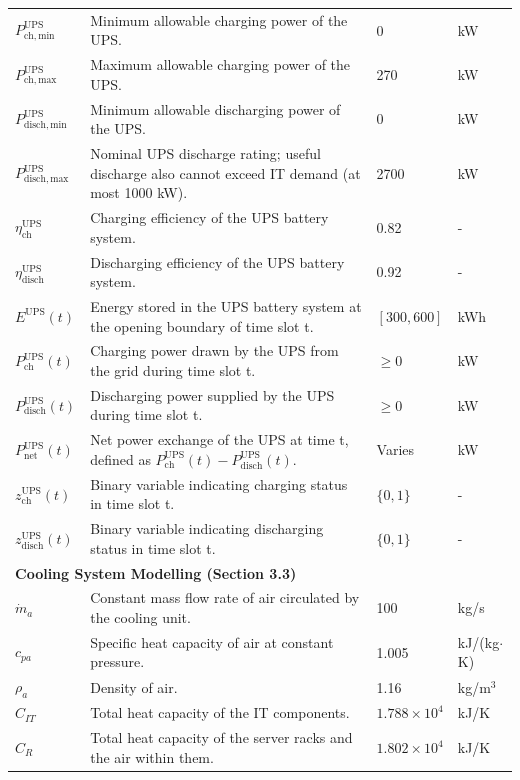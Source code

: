 \documentclass[lettersize,journal]{IEEEtran}
\begin{document}
{{\begin{longtable}{p{} p{} p{} p{}}
$P^{\mathrm{UPS}}_{\mathrm{ch,min}}$ & Minimum allowable charging power of the UPS. & 0 &kW \\
$P^{\mathrm{UPS}}_{\mathrm{ch,max}}$ & Maximum allowable charging power of the UPS. & 270 &kW \\
$P^{\mathrm{UPS}}_{\mathrm{disch,min}}$ & Minimum allowable discharging power of the UPS. & 0 &kW \\
$P^{\mathrm{UPS}}_{\mathrm{disch,max}}$ & Nominal UPS discharge rating; useful discharge also cannot exceed IT demand (at most 1000 kW). & 2700 &kW \\
$\eta^{\mathrm{UPS}}_{\mathrm{ch}}$ & Charging efficiency of the UPS battery system. & 0.82 & - \\
$\eta^{\mathrm{UPS}}_{\mathrm{disch}}$ & Discharging efficiency of the UPS battery system. & 0.92 & - \\
$E^{\mathrm{UPS}}(t)$ & Energy stored in the UPS battery system at the opening boundary of time slot t. & $[300, 600]$ &kWh \\
$P^{\mathrm{UPS}}_{\mathrm{ch}}(t)$ & Charging power drawn by the UPS from the grid during time slot t. & $\geq 0$ &kW \\
$P^{\mathrm{UPS}}_{\mathrm{disch}}(t)$ & Discharging power supplied by the UPS during time slot t. & $\geq 0$ &kW \\
$P^{\mathrm{UPS}}_{\mathrm{net}}(t)$ & Net power exchange of the UPS at time t, defined as $P^{\mathrm{UPS}}_{\mathrm{ch}}(t) - P^{\mathrm{UPS}}_{\mathrm{disch}}(t)$. & Varies &kW \\
$z^{\mathrm{UPS}}_{\mathrm{ch}}(t)$ & Binary variable indicating charging status in time slot t. & $\{0, 1\}$ & - \\
$z^{\mathrm{UPS}}_{\mathrm{disch}}(t)$ & Binary variable indicating discharging status in time slot t. & $\{0, 1\}$ & - \\
\midrule
\multicolumn{4}{l}{\textbf{Cooling System Modelling (Section 3.3)}} \\
\midrule
$\dot{m}_a$ & Constant mass flow rate of air circulated by the cooling unit. & 100 & kg/s \\
$c_{pa}$ & Specific heat capacity of air at constant pressure. & 1.005 & kJ/(kg$\cdot$K) \\
$\rho_a$ & Density of air. & 1.16 & kg/m$^3$ \\
$C_{IT}$ & Total heat capacity of the IT components. & $1.788 \times 10^4$ & kJ/K \\
$C_R$ & Total heat capacity of the server racks and the air within them. & $1.802 \times 10^4$ & kJ/K \\

\end{longtable}}}
\end{document}
